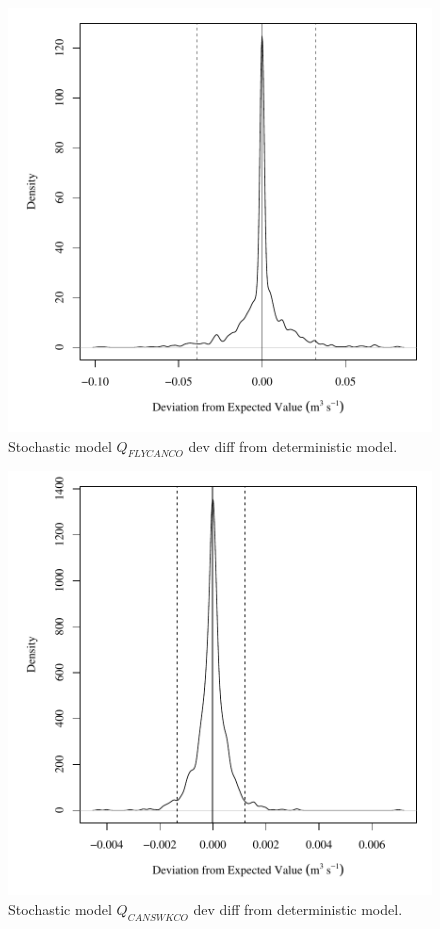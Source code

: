 \begin{center}
\begin{figure}[htbp]
	\includegraphics[width=6in]{"Figures/Results_USR/V dev diff qFLY"}
	\caption{Stochastic model $Q_{FLYCANCO}$ dev diff from deterministic model.}
\end{figure}
\end{center}
\newpage

\begin{center}
\begin{figure}[htbp]
	\includegraphics[width=6in]{"Figures/Results_USR/V dev diff qCAN"}
	\caption{Stochastic model $Q_{CANSWKCO}$ dev diff from deterministic model.}
\end{figure}
\end{center}
\newpage

